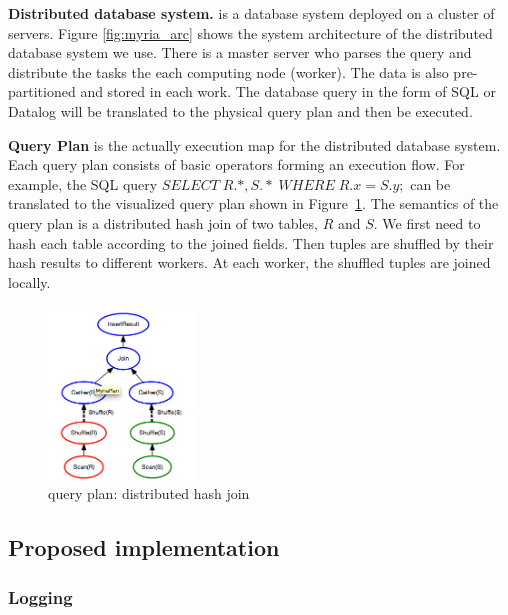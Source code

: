 \documentclass[11pt]{article}
\begin{document}
\noindent\textbf{Distributed database system.} is a database system deployed on a cluster of servers.  Figure \ref{fig:myria_arc} shows the system architecture of the distributed database system we use. There is a master server who parses the query and distribute the tasks the each computing node (worker). The data is also pre-partitioned and stored in each work.  The database query in the form of SQL or Datalog will be translated to the physical query plan and then be executed.

\noindent\textbf{Query Plan} is the actually execution map for the distributed database system.  Each query plan consists of basic operators forming an execution flow. For example, the SQL query $SELECT \; R.*, S.*  \; WHERE \; R.x=S.y ;$ can be translated to the visualized query plan shown in Figure~\ref{fig:query_plan}. The semantics of the query plan is a distributed hash join of two tables, $R$ and $S$. We first need to hash each table according to the joined fields. Then tuples are shuffled by their hash results to different workers. At each worker, the shuffled tuples are joined locally.


\begin{figure}
 \begin{center}
     \includegraphics[width=0.35\textwidth]{partition_join.png}
   \end{center}
  \caption{query plan: distributed hash join}
  \label{fig:query_plan}
\end{figure}



\subsection{Proposed implementation}
	\subsubsection{Logging}
\end{document}
